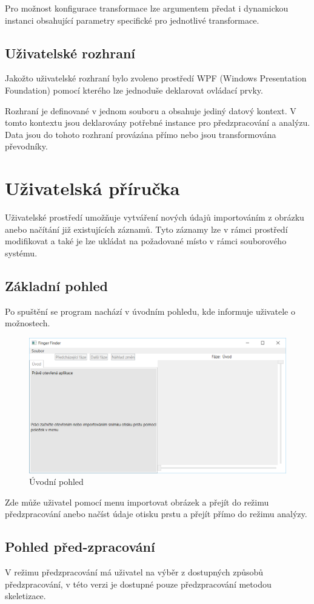 \documentclass[12pt,a4paper]{article}
\let\oldsection\section
\renewcommand\section{\clearpage\oldsection}
\begin{document}
Pro možnost konfigurace transformace lze argumentem předat i dynamickou instanci obsahující parametry specifické pro jednotlivé transformace.

\subsection{Uživatelské rozhraní}
Jakožto uživatelské rozhraní bylo zvoleno prostředí WPF (Windows Presentation Foundation) pomocí kterého lze jednoduše deklarovat ovládací prvky.

Rozhraní je definované v jednom souboru a obsahuje jediný datový kontext. V tomto kontextu jsou deklarovány potřebné instance pro předzpracování a analýzu. Data jsou do tohoto rozhraní provázána přímo nebo jsou transformována převodníky.

\section{Uživatelská příručka}
Uživatelské prostředí umožňuje vytváření nových údajů importováním z obrázku anebo načítání již existujících záznamů.
Tyto záznamy lze v rámci prostředí modifikovat a také je lze ukládat na požadované místo v rámci souborového systému.
\subsection{Základní pohled}
Po spuštění se program nachází v úvodním pohledu, kde informuje uživatele o možnostech.
\begin{figure}[h]
  \centering
\includegraphics[width=120mm]{img/um_01_intro.png}
  \caption{Úvodní pohled}
\end{figure}
Zde může uživatel pomocí menu importovat obrázek a přejít do režimu předzpracování anebo načíst údaje otisku prstu a přejít přímo do režimu analýzy.

\newpage
\subsection{Pohled před-zpracování}
V režimu předzpracování má uživatel na výběr z dostupných způsobů předzpracování, v této verzi je dostupné pouze předzpracování metodou skeletizace.
\end{document}
